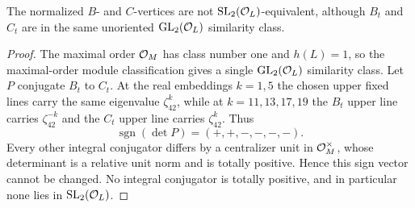 \begin{proposition}\label{prop:BCdistinct}
The normalized $B$- and $C$-vertices are not
$\mathrm{SL}_2(\mathcal O_L)$-equivalent, although $B_t$ and $C_t$ are in the same
unoriented $\mathrm{GL}_2(\mathcal O_L)$ similarity class.
\end{proposition}
\begin{proof}
The maximal order $\mathcal O_M$ has class number one and $h(L)=1$, so the maximal-order
module classification gives a single $\mathrm{GL}_2(\mathcal O_L)$ similarity class.
Let $P$ conjugate $B_t$ to $C_t$.  At the real embeddings $k=1,5$ the chosen
upper fixed lines carry the same eigenvalue $\zeta_{42}^k$, while at
$k=11,13,17,19$ the $B_t$ upper line carries $\zeta_{42}^{-k}$ and the
$C_t$ upper line carries $\zeta_{42}^k$.  Thus
\[
 \operatorname{sgn}(\det P)=(+,+,-,-,-,-).
\]
Every other integral conjugator differs by a centralizer unit in $\mathcal O_M^\times$,
whose determinant is a relative unit norm and is totally positive.  Hence this
sign vector cannot be changed.  No integral conjugator is totally positive,
and in particular none lies in $\mathrm{SL}_2(\mathcal O_L)$.
\end{proof}

